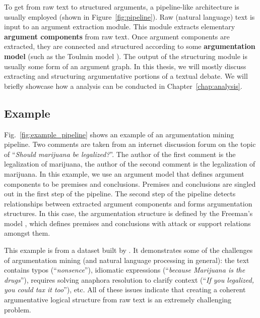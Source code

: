 To get from raw text to structured arguments, a pipeline-like architecture
is usually employed (shown in Figure~\ref{fig:pipeline}). 
Raw (natural language) text is input to an argument extraction module. This module
extracts elementary \textbf{argument components} from raw text. 
Once argument components are extracted, they are connected and structured 
according to some \textbf{argumentation model} (such as the Toulmin model \citep{toulmin2003uses}).
The output of the structuring module is usually some form of an argument graph. 
In this thesis, we will mostly discuss extracting and structuring argumentative
portions of a textual debate. We will briefly showcase how a analysis can be
conducted in Chapter~\ref{chap:analysis}. 

\subsection{Example}


Fig.~\ref{fig:example_pipeline} shows an example of an argumentation mining
pipeline. Two comments are taken from an internet discussion forum on the topic
of ``\emph{Should marijuana be legalized?}''. The author of the first comment
is  the legalization of marijuana, the author of the second
comment is  the legalization of marijuana.  In this example, we use an
argument model that defines argument components to be premises and conclusions.
Premises and conclusions are singled out in the first step of the pipeline.
The second step of the pipeline detects relationships between extracted
argument components and forms argumentation structures. In this case, the
argumentation structure is defined by the Freeman's model
\citep{freeman2011argument}, which defines premises and conclusions with attack
or support relations amongst them. 

This example is from a dataset built by \citet{hasan2014you}. It demonstrates
some of the challenges of argumentation mining (and natural language processing
in general): the text contains typos (``\emph{nonsence}''), idiomatic
expressions (``\emph{because Marijuana is the drugs}''), requires solving
anaphora resolution to clarify context (``\emph{If you legalized, you could tax
it too}''), etc. All of these issues indicate that creating a coherent
argumentative logical structure from raw text is an extremely challenging
problem.

